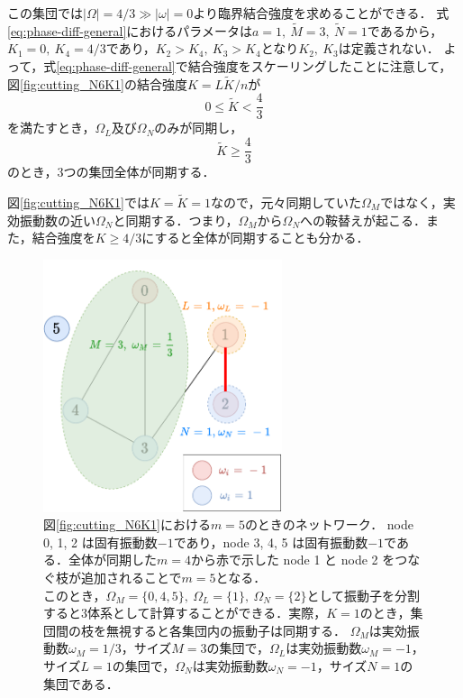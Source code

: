 \documentclass[../main]{subfiles}
\begin{document}
この集団では$|\Omega|=4/3\gg|\omega|=0$より臨界結合強度を求めることができる．
式\eqref{eq:phase-diff-general}におけるパラメータは$a=1,\ \tilde{M}=3,\ \tilde{N}=1$であるから，
$K_1=0,\ K_4=4/3$であり，$K_2>K_4,\ K_3>K_4$となり$K_2,\ K_3$は定義されない．
よって，式\eqref{eq:phase-diff-general}で結合強度をスケーリングしたことに注意して，図\ref{fig:cutting_N6K1}の結合強度$K=L\tilde{K}/n$が
\begin{equation*}
    0\leq \tilde{K}<\frac{4}{3}
\end{equation*}
を満たすとき，$\Omega_L$及び$\Omega_N$のみが同期し，
\begin{equation*}
    \tilde{K}\geq \frac{4}{3}
\end{equation*}
のとき，3つの集団全体が同期する．

図\ref{fig:cutting_N6K1}では$K=\tilde{K}=1$なので，元々同期していた$\Omega_M$ではなく，実効振動数の近い$\Omega_N$と同期する．つまり，$\Omega_M$から$\Omega_N$への鞍替えが起こる．また，結合強度を$K\geq 4/3$にすると全体が同期することも分かる．

\begin{figure}[tbp]
\centering
\includegraphics[width=70mm]{images/cutting_N6_drawio.pdf}
\centering
\caption{図\ref{fig:cutting_N6K1}における$m=5$のときのネットワーク．
node 0, 1, 2 は固有振動数$-1$であり，node 3, 4, 5 は固有振動数$-1$である．全体が同期した$m=4$から赤で示した node 1 と node 2 をつなぐ枝が追加されることで$m=5$となる．\\
このとき，$\Omega_M=\{0,4,5\},\ \Omega_L=\{1\},\ \Omega_N=\{2\}$として振動子を分割すると3体系として計算することができる．実際，$K=1$のとき，集団間の枝を無視すると各集団内の振動子は同期する．
$\Omega_M$は実効振動数$\omega_M=1/3$，サイズ$M=3$の集団で，$\Omega_L$は実効振動数$\omega_M=-1$，サイズ$L=1$の集団で，$\Omega_N$は実効振動数$\omega_N=-1$，サイズ$N=1$の集団である．}
\label{fig:cutting_N6-m5}
\end{figure}
\end{document}

